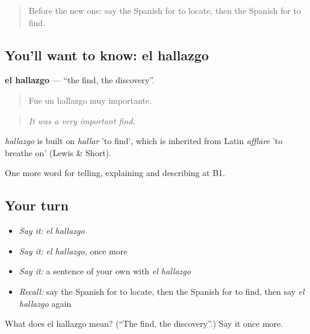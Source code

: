 \label{lesson:ES-C531-hallazgo}



\begin{quote}
Before the new one: say the Spanish for to locate, then the Spanish for to find.
\end{quote}

\subsection*{You'll want to know: el hallazgo}
\textbf{el hallazgo} — \textquotedblleft{}the find, the discovery\textquotedblright{}.

\begin{quote}
Fue un hallazgo muy importante.
\end{quote}

\begin{quote}
\emph{It was a very important find.}
\end{quote}

\begin{cousinweb}
\emph{hallazgo} is built on \emph{hallar} 'to find', which is inherited from Latin \emph{afflāre} 'to breathe on' (Lewis \& Short).
\end{cousinweb}

\begin{grammarlens}[title={What you've built}]
One more word for telling, explaining and describing at B1.
\end{grammarlens}

\subsection*{Your turn}
\begin{itemize}
\raggedright
  \item \emph{Say it:} \emph{el hallazgo}
  \item \emph{Say it:} \emph{el hallazgo}, once more
  \item \emph{Say it:} a sentence of your own with \emph{el hallazgo}
  \item \emph{Recall:} say the Spanish for to locate, then the Spanish for to find, then say \emph{el hallazgo} again
\end{itemize}

\begin{tcolorbox}[breakable,colback=teal!4,colframe=teal!35!black,title={Before you move on}]
What does el hallazgo mean? (\textquotedblleft{}The find, the discovery\textquotedblright{}.) Say it once more.
\end{tcolorbox}
